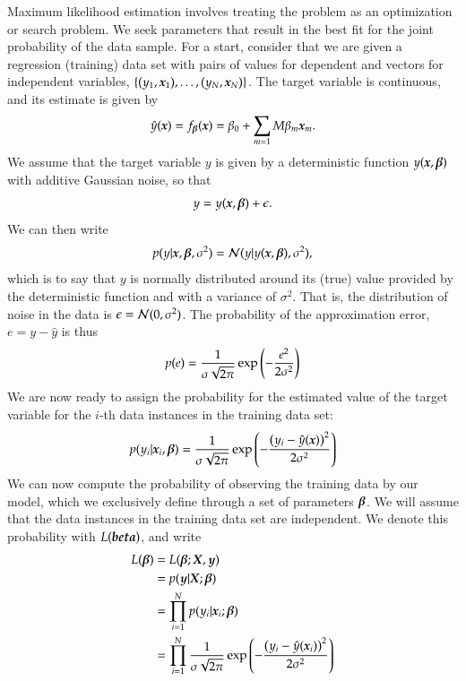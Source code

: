 \begin{refsection}
Maximum likelihood estimation involves treating the problem as an optimization or search problem. We seek parameters that result in the best fit for the joint probability of the data sample. For a start, consider that we are given a regression (training) data set with pairs of values for dependent and vectors for independent variables, $\{(y_1,\boldsymbol{x}_1), \ldots, (y_N,\boldsymbol{x}_N)\}$. The target variable is continuous, and its estimate is given by
\begin{equation}
\hat y(\boldsymbol{x})=f_{\boldsymbol{\beta}}(\boldsymbol{x})=\beta_0+\sum_{m=1}M\beta_m\boldsymbol{x}_m.
\end{equation}
We assume that the target variable $y$ is given by a deterministic function $y(\boldsymbol{x},\boldsymbol{\beta})$ with additive Gaussian noise, so that
\begin{equation}
y=y(\boldsymbol{x},\boldsymbol{\beta})+\epsilon.
\end{equation}
We can then write
\begin{equation}
p(y|\boldsymbol{x},\boldsymbol{\beta},\sigma^2) = \mathcal{N}(y|y(\boldsymbol{x},\boldsymbol{\beta}),\sigma^2),
\end{equation}
which is to say that $y$ is normally distributed around its (true) value provided by the deterministic function and with a variance of $\sigma^2$. That is, the distribution of noise in the data is $\epsilon=\mathcal{N}(0,\sigma^2)$.  The probability of the approximation error, $e=y-\hat{y}$ is thus
\begin{equation}
p(e)={1\over\sigma\sqrt{2\pi}}\exp\left({-{e^2\over 2\sigma^2}}\right)
\end{equation}
We are now ready to assign the probability for the estimated value of the target variable for the $i$-th data instances in the training data set:
\begin{equation}
p(y_i|\boldsymbol{x}_i,\boldsymbol{\beta}) = {1\over\sigma\sqrt{2\pi}}\exp\left({-{\left(y_i-\hat{y}(\boldsymbol{x})\right)^2\over 2\sigma^2}}\right)
\end{equation}
We can now compute the probability of observing the training data by our model, which we exclusively define through a set of parameters $\boldsymbol{\beta}$. We will assume that the data instances in the training data set are independent. We denote this probability with $L(\boldsymbol{beta})$, and write
\begin{align}
L(\boldsymbol{\beta}) & = L(\boldsymbol{\beta}; \boldsymbol{X}, \boldsymbol{y}) \\
& = p(\boldsymbol{y}|\boldsymbol{X};\boldsymbol{\beta}) \\
& = \prod_{i=1}^N p(y_i|\boldsymbol{x}_i;\boldsymbol{\beta}) \\
& = \prod_{i=1}^N {1\over\sigma\sqrt{2\pi}} \exp\left({-{\left(y_i-\hat{y}(\boldsymbol{x}_i)\right)^2\over 2\sigma^2}}\right)
\end{align}


\end{refsection}
